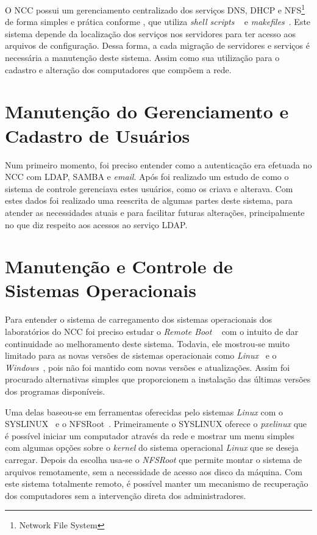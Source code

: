 \documentclass[a4paper,11pt]{article}
\begin{document}
O NCC possui um gerenciamento centralizado dos serviços DNS, DHCP e
NFS\footnote{Network File System} \cite{nfshowto} de forma simples e
prática conforme \cite{sistemancc}, que utiliza \textit{shell scripts}
~\cite{advancedbash} e \textit{makefiles}~\cite{gnumake}. 
Este sistema depende da
localização dos serviços nos servidores para ter acesso aos arquivos
de configuração. Dessa forma, a cada migração de servidores e serviços
é necessária a manutenção deste sistema. Assim como sua utilização
para o cadastro e alteração dos computadores que compõem a rede.

\section{Manutenção do Gerenciamento e Cadastro de Usuários}

Num primeiro momento, foi preciso entender como a autenticação era
efetuada no NCC com LDAP, SAMBA \cite{samba} e \textit{email}.
Após foi realizado um estudo de como o
sistema de controle gerenciava estes usuários, como os criava e
alterava. Com estes dados foi realizado uma reescrita de algumas
partes deste sistema, para atender as necessidades atuais
e para facilitar futuras alterações, principalmente no que diz
respeito aos acessos ao serviço LDAP.

\section{Manutenção e Controle de Sistemas Operacionais}

Para entender o sistema de carregamento dos sistemas operacionais dos
laboratórios do NCC foi preciso estudar o \textit{Remote Boot}
~\cite{remoteboot} com o intuito de dar continuidade ao melhoramento
deste sistema. Todavia, ele mostrou-se muito limitado para as novas
versões de sistemas operacionais como \textit{Linux}~\cite{linuxkernel}
e o \textit{Windows}~\cite{windows}, pois não foi mantido com novas
versões e atualizações. Assim foi procurado alternativas simples que
proporcionem a instalação das últimas versões dos programas
disponíveis.

Uma delas baseou-se em ferramentas oferecidas pelo sistemas
\textit{Linux} com o SYSLINUX~\cite{syslinux} e o
NFSRoot~\cite{nfsroot}. Primeiramente o SYSLINUX oferece o
\textit{pxelinux} que é possível iniciar um computador através da rede
e mostrar um menu simples com algumas opções sobre o \textit{kernel}
do sistema operacional \textit{Linux} que se deseja carregar. Depois
da escolha usa-se o \textit{NFSRoot} que permite montar o sistema de
arquivos remotamente, sem a necessidade de acesso aos disco da
máquina. Com este sistema totalmente remoto, é possível manter um
mecanismo de recuperação dos computadores sem a intervenção direta dos
administradores.
\end{document}
